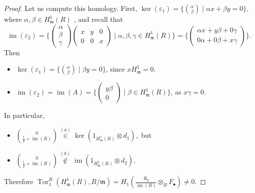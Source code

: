\documentclass[11pt,a4paper]{amsart}
\numberwithin{equation}{section}
\theoremstyle{definition}
\theoremstyle{remark}
\newcommand{\im}{\operatorname{im}}
\begin{document}
\begin{proof}
Let us compute this homology. First, \(\ker(\varepsilon_1) = \{\binom{\alpha}{\beta}\mid \alpha x+\beta y=0\}\), where \(\alpha,\beta\in H^1_{\mathfrak{m}}(R)\) ,  
and recall that  $$\im(\varepsilon_2) =\bigg\{ \begin{pmatrix}\alpha\\\beta\\\gamma\end{pmatrix}\begin{pmatrix}x&y&0\\0&0&x\end{pmatrix}\mid \alpha ,\beta,\gamma\in H^1_{\mathfrak{m}}(R)\bigg\}=\bigg\{ \begin{pmatrix}\alpha x+y\beta+0\gamma\\ 0\alpha+0\beta+x\gamma\end{pmatrix}\bigg\}.$$ 
Then
\begin{itemize}
\item[(a)] 
\(\ker(\varepsilon_1) = \{\binom{\alpha}{\beta}\mid \beta y=0\}\), since
\(xH^1_{\mathfrak{m}}=0\).
\item[(b)] \(\operatorname{im}(\varepsilon_2) =\operatorname{im}(A) = \bigg\{ \begin{pmatrix} y\beta \\ 0\end{pmatrix}\mid\beta\in H^1_{\mathfrak{m}}(R)\bigg\}\), as $x\gamma=0$.
	\end{itemize}
 In particular,

\begin{itemize}
\item[$\bullet$]
\(	\binom{0}{\frac1y+\operatorname{im}(R)} \stackrel{(a)}\in \ker(1_{H^1_{\mathfrak{m}}(R)}\otimes d_1),\) but
\item[$\bullet$]	
\(		\binom{0}{\frac1y+\operatorname{im}(R)} \stackrel{(b)}\notin \operatorname{im}(1_{H^1_{\mathfrak{m}}(R)}\otimes d_2).
\) 
\end{itemize}

Therefore \(\operatorname{Tor}_1^R(H^1_{\mathfrak{m}}(R),R/\mathfrak{m}) = H_1(\frac{R_y}{\operatorname{im}(R)}\otimes_R F_\bullet) \neq 0\).
	

\end{proof}
\end{document}
